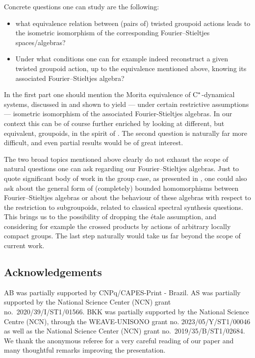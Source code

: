 \documentclass[11 pt, leqno]{amsart}
\numberwithin{equation}{section}
\theoremstyle{plain}
\theoremstyle{definition}
\newcommand{\cst}{\ifmmode\mathrm{C}^*\else{$\mathrm{C}^*$}\fi}
\begin{document}
Concrete questions one can study are the following:
\begin{itemize}
    \item what equivalence relation between (pairs of) twisted groupoid actions leads to the isometric isomorphism of the corresponding Fourier--Stieltjes spaces/algebras? 
    \item Under what conditions one can for example indeed reconstruct a given twisted groupoid action, up to the equivalence mentioned above, knowing its associated Fourier--Stieltjes algebra?
\end{itemize}
In the first part one should mention the Morita equivalence of $\cst$-dynamical systems, discussed in \cite[Section 4]{BedosConti3} and shown to yield --- under certain restrictive assumptions --- isometric isomorphism of the associated Fourier-Stieltjes algebras. 
In our context this can be of course further enriched by looking at different, but equivalent, groupoids, in the spirit of \cite[Section 3.4]{Sims}. 
The second question is naturally far more difficult, and even partial results would be of great interest.

The two broad topics mentioned above clearly do not exhaust the scope of natural questions one can ask regarding our Fourier--Stieltjes algebras. 
Just to quote significant body of work in the group case, as presented in \cite{KaniuthLau}, one could also ask about the general form of (completely) bounded homomorphisms between Fourier--Stieltjes algebras or about the behaviour of these algebras with respect to the restriction to subgroupoids, related to classical spectral synthesis questions. 
This brings us to the possibility of dropping the \'etale assumption, and considering for example the crossed products by actions of arbitrary locally compact groups. 
The last step naturally would take us far beyond the scope of current work.


\subsection*{Acknowledgements}
AB was partially supported by CNPq/CAPES-Print - Brazil. 
AS was partially supported by the National Science Center (NCN) grant no.~2020/39/I/ST1/01566. 
BKK was partially supported by 
the National Science Centre (NCN), through the WEAVE-UNISONO grant no. 2023/05/Y/ST1/00046 as well as the National Science Center (NCN) grant no.~2019/35/B/ST1/02684.
We thank the anonymous referee for a very careful reading of our paper and many thoughtful remarks improving the presentation.

{}
%

 
\end{document}
